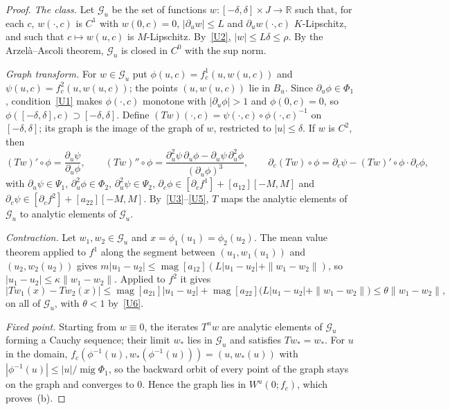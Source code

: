 \documentclass[11pt]{amsart}
\theoremstyle{definition}
\theoremstyle{remark}
\newcommand{\R}{\mathbb{R}}
\newcommand{\magn}{\operatorname{mag}}
\newcommand{\mig}{\operatorname{mig}}
\newcommand{\ival}[1]{[#1]}
\newcommand{\Wu}{W^u}
\begin{document}
\begin{proof}
\emph{The class.} Let $\mathcal G_u$ be the set of functions $w\colon[-\delta,\delta]\times J\to\R$ such
that, for each $c$, $w(\cdot,c)$ is $C^1$ with $w(0,c)=0$, $|\partial_uw|\le L$ and $\partial_uw(\cdot,c)$
$K$-Lipschitz, and such that $c\mapsto w(u,c)$ is $M$-Lipschitz. By~\ref{U2}, $|w|\le L\delta\le\rho$. By
the Arzel\`a--Ascoli theorem, $\mathcal G_u$ is closed in $C^0$ with the sup norm.

\emph{Graph transform.} For $w\in\mathcal G_u$ put $\phi(u,c)=f^1_c(u,w(u,c))$ and
$\psi(u,c)=f^2_c(u,w(u,c))$; the points $(u,w(u,c))$ lie in $B_u$. Since $\partial_u\phi\in\Phi_1$,
condition~\ref{U1} makes $\phi(\cdot,c)$ monotone with $|\partial_u\phi|>1$ and $\phi(0,c)=0$, so
$\phi([-\delta,\delta],c)\supset[-\delta,\delta]$. Define $(Tw)(\cdot,c)=\psi(\cdot,c)\circ\phi(\cdot,c)^{-1}$
on $[-\delta,\delta]$; its graph is the image of the graph of $w$, restricted to $|u|\le\delta$. If $w$ is
$C^2$, then
\[
(Tw)'\circ\phi=\frac{\partial_u\psi}{\partial_u\phi},\qquad
(Tw)''\circ\phi=\frac{\partial_u^2\psi\,\partial_u\phi-\partial_u\psi\,\partial_u^2\phi}{(\partial_u\phi)^3},\qquad
\partial_c(Tw)\circ\phi=\partial_c\psi-(Tw)'\circ\phi\cdot\partial_c\phi ,
\]
with $\partial_u\psi\in\Psi_1$, $\partial_u^2\phi\in\Phi_2$, $\partial_u^2\psi\in\Psi_2$,
$\partial_c\phi\in\ival{\partial_cf^1}+\ival{a_{12}}[-M,M]$ and
$\partial_c\psi\in\ival{\partial_cf^2}+\ival{a_{22}}[-M,M]$. By~\ref{U3}--\ref{U5}, $T$ maps the analytic
elements of $\mathcal G_u$ to analytic elements of $\mathcal G_u$.

\emph{Contraction.} Let $w_1,w_2\in\mathcal G_u$ and $x=\phi_1(u_1)=\phi_2(u_2)$. The mean value theorem
applied to $f^1$ along the segment between $(u_1,w_1(u_1))$ and $(u_2,w_2(u_2))$ gives
$m|u_1-u_2|\le\magn\ival{a_{12}}(L|u_1-u_2|+\|w_1-w_2\|)$, so $|u_1-u_2|\le\kappa\|w_1-w_2\|$. Applied to
$f^2$ it gives
\[
|Tw_1(x)-Tw_2(x)|\le\magn\ival{a_{21}}|u_1-u_2|+\magn\ival{a_{22}}\bigl(L|u_1-u_2|+\|w_1-w_2\|\bigr)\le\theta\|w_1-w_2\| ,
\]
on all of $\mathcal G_u$, with $\theta<1$ by~\ref{U6}.

\emph{Fixed point.} Starting from $w\equiv0$, the iterates $T^nw$ are analytic elements of $\mathcal G_u$
forming a Cauchy sequence; their limit $w_*$ lies in $\mathcal G_u$ and satisfies $Tw_*=w_*$. For $u$ in the
domain, $f_c(\phi^{-1}(u),w_*(\phi^{-1}(u)))=(u,w_*(u))$ with $|\phi^{-1}(u)|\le|u|/\mig\Phi_1$, so the
backward orbit of every point of the graph stays on the graph and converges to $0$. Hence the graph lies
in $\Wu(0;f_c)$, which proves~(b).


\end{proof}
\end{document}
